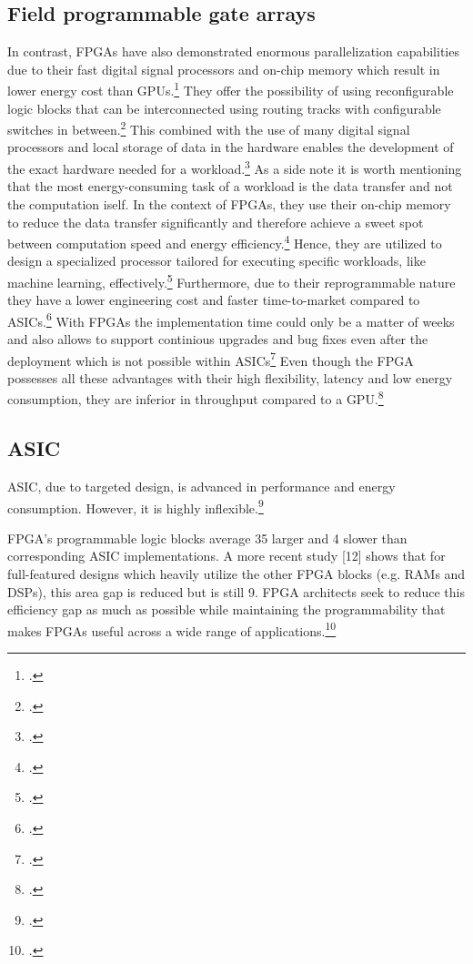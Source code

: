 \subsection{Field programmable gate arrays}
In contrast, \ac{FPGA}s have also demonstrated enormous parallelization capabilities due to their fast digital signal processors and on-chip
memory which result in lower energy cost than GPUs.\footcite[cf.][2693]{ahmadOptimizingHardwareAccelerated2020}
They offer the possibility of using reconfigurable logic blocks that can be interconnected using routing tracks with configurable switches in between.\footcite[cf.][144]{babuReconfigurableFPGAArchitectures2021}
This combined with the use of many digital signal processors and local storage of data in the hardware enables the development of the exact hardware needed for a workload.\footcite[cf.][19]{baischerLearningHardwareTutorial2021}
As a side note it is worth mentioning that the most energy-consuming task of a workload is the data transfer and not the computation iself.
In the context of \ac{FPGA}s, they use their on-chip memory to reduce the data transfer significantly and therefore achieve a sweet spot between computation speed and energy efficiency.\footcite[cf.][101-102]{huSurveyConvolutionalNeural2022}
Hence, they are utilized to design a specialized processor tailored for executing specific workloads, like machine learning, effectively.\footcite[cf.][322]{sipolaArtificialIntelligenceIoT2022}
Furthermore, due to their reprogrammable nature they have a lower engineering cost and faster time-to-market compared to \ac{ASIC}s.\footcite[cf.][4]{boutrosFPGAArchitecturePrinciples2021}
With \ac{FPGA}s the implementation time could only be a matter of weeks and also allows to support continious upgrades and bug fixes even after the deployment which is not possible within \ac{ASIC}s\footcite[cf.][4]{boutrosFPGAArchitecturePrinciples2021}
Even though the \ac{FPGA} possesses all these advantages with their high flexibility, latency and low energy consumption, they are inferior in throughput compared to a \ac{GPU}.\footcite[cf.][100]{huSurveyConvolutionalNeural2022}

\subsection{ASIC}
ASIC, due to targeted design, is
advanced in performance and energy consumption. However, it
is highly inflexible.\footcite[cf.][100]{huSurveyConvolutionalNeural2022}

FPGA’s
programmable logic blocks average 35 larger and 4
slower than corresponding ASIC implementations. A
more recent study [12] shows that for full-featured designs which heavily utilize the other FPGA blocks (e.g.
RAMs and DSPs), this area gap is reduced but is still
9. FPGA architects seek to reduce this efficiency gap
as much as possible while maintaining the programmability that makes FPGAs useful across a wide range
of applications.\footcite[cf.][5]{boutrosFPGAArchitecturePrinciples2021}

